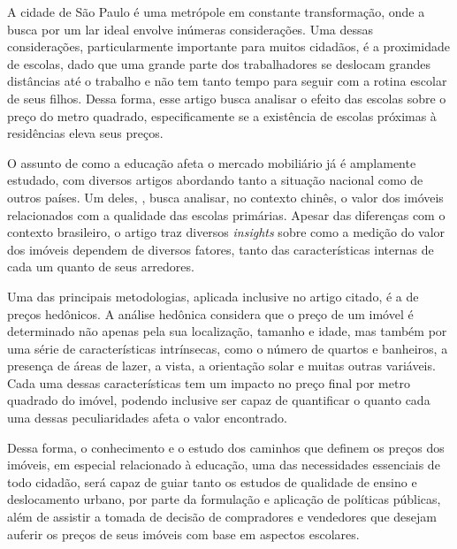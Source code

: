 
A cidade de São Paulo é uma metrópole em constante transformação, onde a busca por um lar ideal envolve inúmeras considerações. Uma dessas considerações, particularmente importante para muitos cidadãos, é a proximidade de escolas, dado que uma grande parte dos trabalhadores se deslocam grandes distâncias até o trabalho e não tem tanto tempo para seguir com a rotina escolar de seus filhos. Dessa forma, esse artigo busca analisar o efeito das escolas sobre o preço do metro quadrado, especificamente se a existência de escolas próximas à residências eleva seus preços. 

O assunto de como a educação afeta o mercado mobiliário já é amplamente estudado, com diversos artigos abordando tanto a situação nacional como de outros países. Um deles,  \cite{chan2020valuing}, busca analisar, no contexto chinês, o valor dos imóveis relacionados com a qualidade das escolas primárias. Apesar das diferenças com o contexto brasileiro, o artigo traz diversos \textit{insights} sobre como a medição do valor dos imóveis dependem de diversos fatores, tanto das características internas de cada um quanto de seus arredores.

Uma das principais metodologias, aplicada inclusive no artigo citado, é a de preços hedônicos. A análise hedônica considera que o preço de um imóvel é determinado não apenas pela sua localização, tamanho e idade, mas também por uma série de características intrínsecas, como o número de quartos e banheiros, a presença de áreas de lazer, a vista, a orientação solar e muitas outras variáveis. Cada uma dessas características tem um impacto no preço final por metro quadrado do imóvel, podendo inclusive ser capaz de quantificar o quanto cada uma dessas peculiaridades afeta o valor encontrado.

Dessa forma, o conhecimento e o estudo dos caminhos que definem os preços dos imóveis, em especial relacionado à educação, uma das necessidades essenciais de todo cidadão, será capaz de guiar tanto os estudos de qualidade de ensino e deslocamento urbano, por parte da formulação e aplicação de políticas públicas, além de assistir a tomada de decisão de compradores e vendedores que desejam auferir os preços de seus imóveis com base em aspectos escolares.

